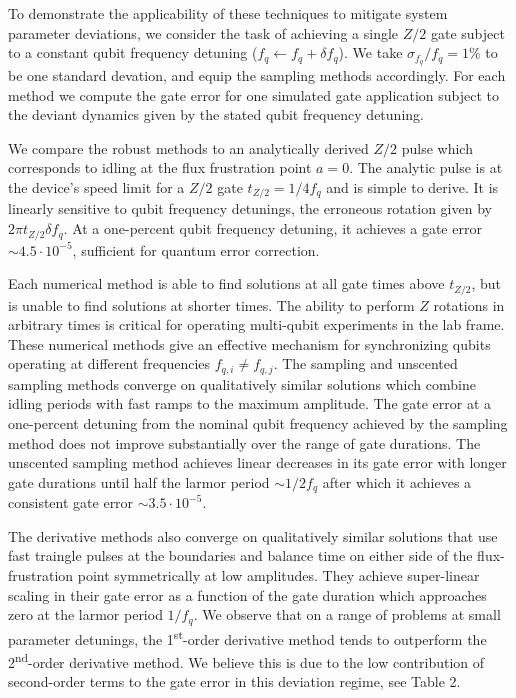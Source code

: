 \documentclass[
  amsfonts,
  amsmath,
  tbtags,
  amssymb,
  aps,
  nobibnotes,
  twocolumn,
  superscriptaddress,
]{revtex4-2}
\begin{document}
To demonstrate the applicability of these techniques
to mitigate system parameter deviations,
we consider the task of achieving a single $Z/2$
gate subject to a constant qubit frequency detuning
($f_{q} \gets f_{q} + \delta f_{q}$).
We take $\sigma_{f_{q}} / f_{q} = 1\%$ to be one standard devation, and equip
the sampling methods accordingly. For each method we compute the gate error for
one simulated gate application subject to the deviant dynamics given by the
stated qubit frequency detuning.

We compare the robust methods to an analytically derived $Z/2$ pulse which corresponds to
idling at the flux frustration point $a = 0$. The analytic pulse
is at the device's speed limit for a $Z/2$ gate $t_{Z/2} = 1 / 4 f_{q}$ and
is simple to derive. It is linearly sensitive to qubit frequency detunings,
the erroneous rotation given by $2 \pi t_{Z/2} \delta f_{q}$. At a one-percent
qubit frequency detuning, it achieves a gate error $\sim 4.5 \cdot 10^{-5}$,
sufficient for quantum error correction.

Each numerical method is able to find solutions at
all gate times above $t_{Z/2}$, but is unable to find solutions at shorter times.
The ability to perform $Z$ rotations in arbitrary times
is critical for operating multi-qubit experiments in the lab frame.
These numerical methods give an effective mechanism for synchronizing
qubits operating at different frequencies $f_{q, i} \neq f_{q, j}$.
The sampling and unscented sampling methods
converge on qualitatively similar solutions which combine idling periods
with fast ramps to the maximum amplitude. The gate error at a one-percent
detuning from the nominal qubit frequency achieved
by the sampling method does not improve substantially over the
range of gate durations. The unscented sampling method
achieves linear decreases in its gate error with longer gate durations
until half the larmor period $\sim 1 / 2 f_{q}$ after which it achieves a consistent
gate error $\sim 3.5 \cdot 10^{-5}$.

The derivative methods also converge on qualitatively similar solutions that
use fast traingle pulses at the boundaries and balance time
on either side of the flux-frustration point symmetrically at low amplitudes.
They achieve super-linear scaling in their gate error as
a function of the gate duration which approaches zero at the larmor
period $1 / f_{q}$. We observe that on a range of problems at small parameter detunings,
the 1\textsuperscript{st}-order derivative method tends to outperform the 2\textsuperscript{nd}-order
derivative method. We believe this is due to the low contribution of second-order
terms to the gate error in this deviation regime, see Table 2.
\end{document}
